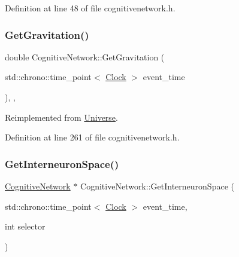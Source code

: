 Definition at line 48 of file cognitivenetwork.\+h.

\mbox{\label{class_cognitive_network_a4b5150310288c52f00ecb745ae9e7f86}} 
\subsubsection{\texorpdfstring{Get\+Gravitation()}{GetGravitation()}}
{\footnotesize\ttfamily double Cognitive\+Network\+::\+Get\+Gravitation (\begin{DoxyParamCaption}\item[{std\+::chrono\+::time\+\_\+point$<$ \mbox{\hyperlink{universe_8h_a0ef8d951d1ca5ab3cfaf7ab4c7a6fd80}{Clock}} $>$}]{event\+\_\+time }\end{DoxyParamCaption})\hspace{0.3cm}{\ttfamily [inline]}, {\ttfamily [final]}, {\ttfamily [virtual]}}



Reimplemented from \mbox{\hyperlink{class_universe_ab0404e774ee0ed66b597ff5b8e989446}{Universe}}.



Definition at line 261 of file cognitivenetwork.\+h.

\mbox{\label{class_cognitive_network_a0119d61e86ea6b84ad7f69f88d59d008}} 
\subsubsection{\texorpdfstring{Get\+Interneuron\+Space()}{GetInterneuronSpace()}}
{\footnotesize\ttfamily \mbox{\hyperlink{class_cognitive_network}{Cognitive\+Network}} $\ast$ Cognitive\+Network\+::\+Get\+Interneuron\+Space (\begin{DoxyParamCaption}\item[{std\+::chrono\+::time\+\_\+point$<$ \mbox{\hyperlink{universe_8h_a0ef8d951d1ca5ab3cfaf7ab4c7a6fd80}{Clock}} $>$}]{event\+\_\+time,  }\item[{int}]{selector }\end{DoxyParamCaption})}



